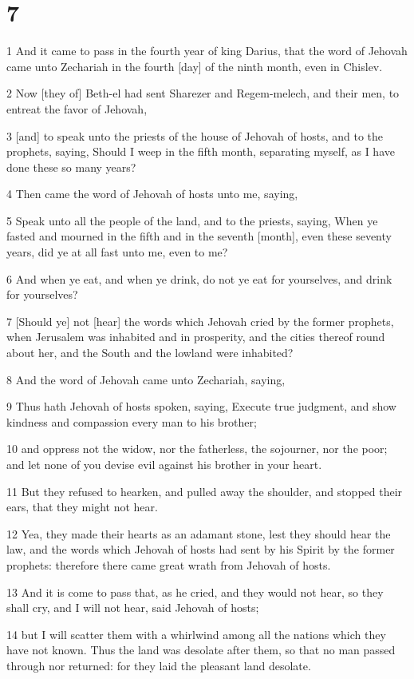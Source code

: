 \chapter{7}

\par 1 And it came to pass in the fourth year of king Darius, that the word of Jehovah came unto Zechariah in the fourth [day] of the ninth month, even in Chislev.
\par 2 Now [they of] Beth-el had sent Sharezer and Regem-melech, and their men, to entreat the favor of Jehovah,
\par 3 [and] to speak unto the priests of the house of Jehovah of hosts, and to the prophets, saying, Should I weep in the fifth month, separating myself, as I have done these so many years?
\par 4 Then came the word of Jehovah of hosts unto me, saying,
\par 5 Speak unto all the people of the land, and to the priests, saying, When ye fasted and mourned in the fifth and in the seventh [month], even these seventy years, did ye at all fast unto me, even to me?
\par 6 And when ye eat, and when ye drink, do not ye eat for yourselves, and drink for yourselves?
\par 7 [Should ye] not [hear] the words which Jehovah cried by the former prophets, when Jerusalem was inhabited and in prosperity, and the cities thereof round about her, and the South and the lowland were inhabited?
\par 8 And the word of Jehovah came unto Zechariah, saying,
\par 9 Thus hath Jehovah of hosts spoken, saying, Execute true judgment, and show kindness and compassion every man to his brother;
\par 10 and oppress not the widow, nor the fatherless, the sojourner, nor the poor; and let none of you devise evil against his brother in your heart.
\par 11 But they refused to hearken, and pulled away the shoulder, and stopped their ears, that they might not hear.
\par 12 Yea, they made their hearts as an adamant stone, lest they should hear the law, and the words which Jehovah of hosts had sent by his Spirit by the former prophets: therefore there came great wrath from Jehovah of hosts.
\par 13 And it is come to pass that, as he cried, and they would not hear, so they shall cry, and I will not hear, said Jehovah of hosts;
\par 14 but I will scatter them with a whirlwind among all the nations which they have not known. Thus the land was desolate after them, so that no man passed through nor returned: for they laid the pleasant land desolate.

